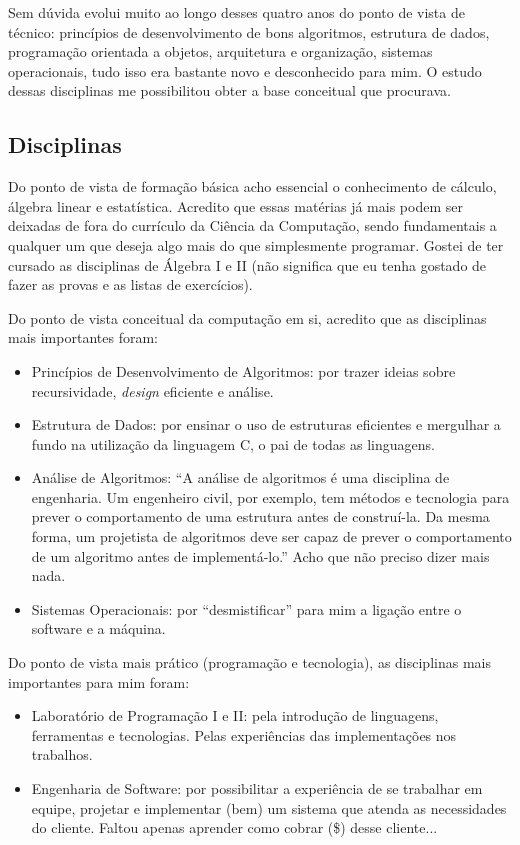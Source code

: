 Sem dúvida evolui muito ao longo desses quatro anos do ponto de vista de técnico: princípios de
desenvolvimento de bons algoritmos, estrutura de dados, programação orientada a objetos, arquitetura
e organização, sistemas operacionais, tudo isso era bastante novo e desconhecido para mim. O estudo
dessas disciplinas me possibilitou obter a base conceitual que procurava.

\subsection{Disciplinas}

Do ponto de vista de formação básica acho essencial o conhecimento de cálculo, álgebra linear e
estatística. Acredito que essas matérias já mais podem ser deixadas de fora do currículo da Ciência
da Computação, sendo fundamentais a qualquer um que deseja algo mais do que simplesmente programar.
Gostei de ter cursado as disciplinas de Álgebra I e II (não significa que eu tenha gostado de fazer
as provas e as listas de exercícios).

Do ponto de vista conceitual da computação em si, acredito que as disciplinas mais importantes
foram:

\begin{itemize}
	\item Princípios de Desenvolvimento de Algoritmos: por trazer ideias sobre recursividade, 
	{\it design} eficiente e análise.
	\item Estrutura de Dados: por ensinar o uso de estruturas eficientes e mergulhar a fundo na
	utilização da linguagem C, o pai de todas as linguagens.
	\item Análise de Algoritmos: ``A análise de algoritmos é uma disciplina de engenharia. Um
	engenheiro civil, por exemplo, tem métodos e tecnologia para prever o comportamento de uma 
	estrutura antes de construí-la. Da mesma forma, um projetista de algoritmos deve ser capaz de 
	prever o comportamento de um algoritmo antes de implementá-lo.'' Acho que não preciso dizer mais
	nada.
	\item Sistemas Operacionais: por ``desmistificar'' para mim a ligação entre o software e a 
	máquina.
\end{itemize}

Do ponto de vista mais prático (programação e tecnologia), as disciplinas mais importantes para mim
foram:

\begin{itemize}
	\item Laboratório de Programação I e II: pela introdução de linguagens, ferramentas e tecnologias.
	Pelas experiências das implementações nos trabalhos.
	\item Engenharia de Software: por possibilitar a experiência de se trabalhar em equipe,
	projetar e implementar (bem) um sistema que atenda as necessidades do cliente. Faltou apenas 
	aprender como cobrar (\$) desse cliente...
\end{itemize}

